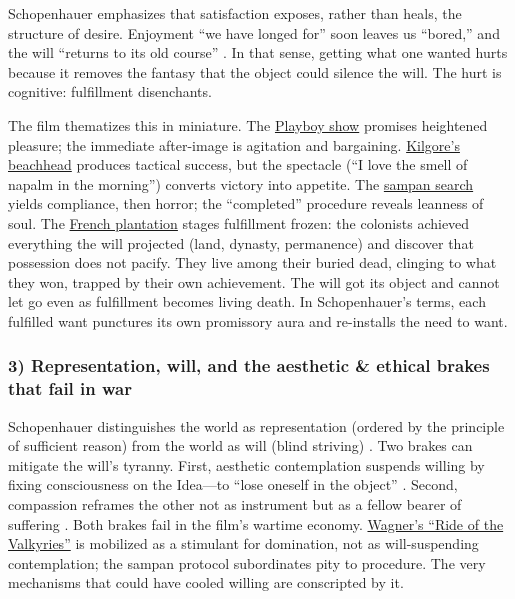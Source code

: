 Schopenhauer emphasizes that satisfaction exposes, rather than heals, the structure of desire.
Enjoyment ``we have longed for'' soon leaves us ``bored,'' and the will ``returns to its old
course'' \parencite[p.~319]{SchopenhauerWWR1969}. In that sense, getting what one wanted hurts
because it removes the fantasy that the object could silence the will. The hurt is cognitive:
fulfillment disenchants.

The film thematizes this in miniature. The \hyperref[scene:playboy-show]{Playboy show}
promises heightened pleasure; the immediate after-image is agitation and bargaining.
\hyperref[scene:kilgore-beach]{Kilgore's beachhead} produces tactical success, but the
spectacle (``I love the smell of napalm in the morning'') converts victory into appetite. The
\hyperref[scene:sampan]{sampan search} yields compliance, then horror; the ``completed''
procedure reveals leanness of soul. The \hyperref[scene:french-plantation]{French plantation}
stages fulfillment frozen: the colonists achieved everything the will projected (land, dynasty,
permanence) and discover that possession does not pacify. They live among their buried dead,
clinging to what they won, trapped by their own achievement. The will got its object and
cannot let go even as fulfillment becomes living death. In Schopenhauer's terms, each
fulfilled want punctures its own promissory aura and re-installs the need to want.

\subsubsection*{3) Representation, will, and the aesthetic \& ethical brakes that fail in war}

Schopenhauer distinguishes the world as representation (ordered by the principle of sufficient
reason) from the world as will (blind striving) \parencite[pp.~3--5]{SchopenhauerWWR1969}.
Two brakes can mitigate the will's tyranny. First, aesthetic contemplation suspends willing by
fixing consciousness on the Idea—to ``lose oneself in the object''
\parencite[p.~178]{SchopenhauerWWR1969}. Second, compassion reframes the other not as instrument
but as a fellow bearer of suffering \parencite[pp.~372--374]{SchopenhauerWWR1969}.
Both brakes fail in the film's wartime economy. \hyperref[scene:kilgore-beach]{Wagner's
	``Ride of the Valkyries''} is mobilized as a stimulant for domination, not as will-suspending
contemplation; the sampan protocol subordinates pity to procedure. The very mechanisms that
could have cooled willing are conscripted by it.

